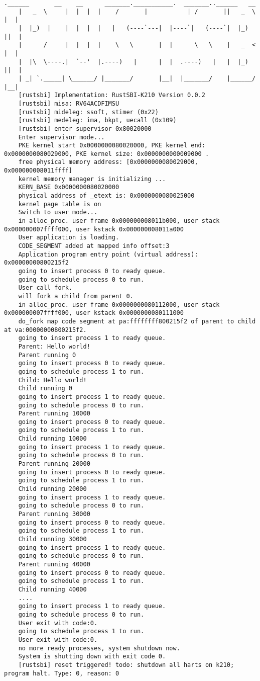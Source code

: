\begin{lstlisting}[caption=lab8实验结果（移植K210后）]
    .______       __    __      _______.___________.  _______..______   __
    |   _  \     |  |  |  |    /       |           | /       ||   _  \ |  |
    |  |_)  |    |  |  |  |   |   (----`---|  |----`|   (----`|  |_)  ||  |
    |      /     |  |  |  |    \   \       |  |      \   \    |   _  < |  |
    |  |\  \----.|  `--'  |.----)   |      |  |  .----)   |   |  |_)  ||  |
    | _| `._____| \______/ |_______/       |__|  |_______/    |______/ |__|
    [rustsbi] Implementation: RustSBI-K210 Version 0.0.2
    [rustsbi] misa: RV64ACDFIMSU
    [rustsbi] mideleg: ssoft, stimer (0x22)
    [rustsbi] medeleg: ima, bkpt, uecall (0x109)
    [rustsbi] enter supervisor 0x80020000
    Enter supervisor mode...
    PKE kernel start 0x0000000080020000, PKE kernel end: 0x0000000080029000, PKE kernel size: 0x0000000000009000 .
    free physical memory address: [0x0000000080029000, 0x000000008011ffff]
    kernel memory manager is initializing ...
    KERN_BASE 0x0000000080020000
    physical address of _etext is: 0x0000000080025000
    kernel page table is on
    Switch to user mode...
    in alloc_proc. user frame 0x000000008011b000, user stack 0x000000007ffff000, user kstack 0x000000008011a000
    User application is loading.
    CODE_SEGMENT added at mapped info offset:3
    Application program entry point (virtual address): 0x00000000800215f2
    going to insert process 0 to ready queue.
    going to schedule process 0 to run.
    User call fork.
    will fork a child from parent 0.
    in alloc_proc. user frame 0x0000000080112000, user stack 0x000000007ffff000, user kstack 0x0000000080111000
    do_fork map code segment at pa:ffffffff800215f2 of parent to child at va:00000000800215f2.
    going to insert process 1 to ready queue.
    Parent: Hello world!
    Parent running 0
    going to insert process 0 to ready queue.
    going to schedule process 1 to run.
    Child: Hello world!
    Child running 0
    going to insert process 1 to ready queue.
    going to schedule process 0 to run.
    Parent running 10000
    going to insert process 0 to ready queue.
    going to schedule process 1 to run.
    Child running 10000
    going to insert process 1 to ready queue.
    going to schedule process 0 to run.
    Parent running 20000
    going to insert process 0 to ready queue.
    going to schedule process 1 to run.
    Child running 20000
    going to insert process 1 to ready queue.
    going to schedule process 0 to run.
    Parent running 30000
    going to insert process 0 to ready queue.
    going to schedule process 1 to run.
    Child running 30000
    going to insert process 1 to ready queue.
    going to schedule process 0 to run.
    Parent running 40000
    going to insert process 0 to ready queue.
    going to schedule process 1 to run.
    Child running 40000
    ....
    going to insert process 1 to ready queue.
    going to schedule process 0 to run.
    User exit with code:0.
    going to schedule process 1 to run.
    User exit with code:0.
    no more ready processes, system shutdown now.
    System is shutting down with exit code 0.
    [rustsbi] reset triggered! todo: shutdown all harts on k210; program halt. Type: 0, reason: 0    
\end{lstlisting}

